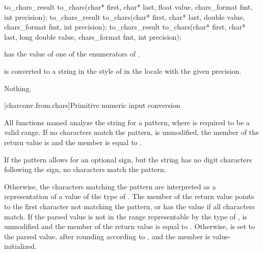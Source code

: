 \begin{indexed}{}
\begin{itemdecl}
to_chars_result to_chars(char* first, char* last, float value,
                         chars_format fmt, int precision);
to_chars_result to_chars(char* first, char* last, double value,
                         chars_format fmt, int precision);
to_chars_result to_chars(char* first, char* last, long double value,
                         chars_format fmt, int precision);
\end{itemdecl}
\end{indexed}

\begin{itemdescr}
\pnum
\expects
{} has the value of
one of the enumerators of .

\pnum
\effects
{} is converted to a string
in the style of 
in the  locale
with the given precision.

\pnum
\throws
Nothing.
\end{itemdescr}


[charconv.from.chars]{Primitive numeric input conversion}

\pnum
All functions named 
analyze the string 
for a pattern,
where  is required to be a valid range.
If no characters match the pattern,
 is unmodified,
the member  of the return value is  and
the member  is equal to .
\begin{note}
If the pattern allows for an optional sign,
but the string has no digit characters following the sign,
no characters match the pattern.
\end{note}
Otherwise,
the characters matching the pattern
are interpreted as a representation
of a value of the type of .
The member 
of the return value
points to the first character
not matching the pattern,
or has the value 
if all characters match.
If the parsed value
is not in the range
representable by the type of ,
 is unmodified and
the member  of the return value
is equal to .
Otherwise,
 is set to the parsed value,
after rounding according to , and
the member  is value-initialized.

